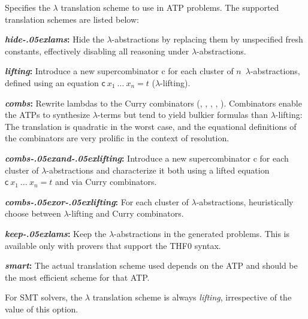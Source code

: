 \documentclass[a4paper,12pt]{article}
\newcommand\const[1]{\textsf{#1}}
\renewcommand\_{\hbox{\textunderscore\kern-.05ex}}
\begin{document}
\begin{enum}
\opdefault{lam\_trans}{string}{smart}
Specifies the $\lambda$ translation scheme to use in ATP problems. The supported
translation schemes are listed below:

\begin{enum}
\item[\labelitemi] \textbf{\textit{hide\_lams}:} Hide the $\lambda$-abstractions
by replacing them by unspecified fresh constants, effectively disabling all
reasoning under $\lambda$-abstractions.

\item[\labelitemi] \textbf{\textit{lifting}:} Introduce a new
supercombinator \const{c} for each cluster of $n$~$\lambda$-abstractions,
defined using an equation $\const{c}~x_1~\ldots~x_n = t$ ($\lambda$-lifting).

\item[\labelitemi] \textbf{\textit{combs}:} Rewrite lambdas to the Curry
combinators (, , , , ). Combinators
enable the ATPs to synthesize $\lambda$-terms but tend to yield bulkier formulas
than $\lambda$-lifting: The translation is quadratic in the worst case, and the
equational definitions of the combinators are very prolific in the context of
resolution.

\item[\labelitemi] \textbf{\textit{combs\_and\_lifting}:} Introduce a new
supercombinator \const{c} for each cluster of $\lambda$-abstractions and characterize it both using a
lifted equation $\const{c}~x_1~\ldots~x_n = t$ and via Curry combinators.

\item[\labelitemi] \textbf{\textit{combs\_or\_lifting}:} For each cluster of
$\lambda$-abstractions, heuristically choose between $\lambda$-lifting and Curry
combinators.

\item[\labelitemi] \textbf{\textit{keep\_lams}:}
Keep the $\lambda$-abstractions in the generated problems. This is available
only with provers that support the THF0 syntax.

\item[\labelitemi] \textbf{\textit{smart}:} The actual translation scheme used
depends on the ATP and should be the most efficient scheme for that ATP.
\end{enum}

For SMT solvers, the $\lambda$ translation scheme is always \textit{lifting},
irrespective of the value of this option.


\end{enum}
\end{document}
